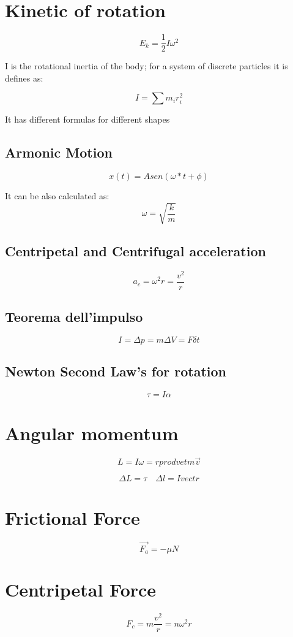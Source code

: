 \documentclass[Master.tex]{subfiles}
\begin{document}
\begin{multicols}{2}
		 \section{Kinetic of rotation}
		  \[
				   E_{k} = \frac{1}{2}I\omega ^2
		  \]

		  I is the rotational inertia of the body; for a system of discrete particles it
		  is defines as:

		  \[
				   I = \sum m_{i}r_{i}^2
		  \]

		  It has different formulas for different shapes

		  \subsection{Armonic Motion}
				   \[
						    x(t) = A sen (\omega * t + \phi )
				   \]

				   It can be also calculated as:
				   \[
						    \omega = \sqrt{\frac{k}{m}}
				   \]

		  \subsection{Centripetal and Centrifugal acceleration}
				   \[
						    a_{c} = \omega^2 r = \frac{v^2}{r}
				   \]

		  \subsection{Teorema dell'impulso}
				   \[
						    I = \Delta p = m \Delta V = F \delta t
				   \]
		  \subsection{Newton Second Law's for rotation}
				   \[
						    \tau = I \alpha
				   \]
		 \section{Angular momentum}
		  \[
				   L = I \omega = r prodvet m \vec{v}
		  \]

		  \[
				   \Delta L = \tau  \quad \Delta l = I vect r
		  \]

		 \section{Frictional Force}
		  \[
				   \vec{F_{a}} = -\mu N
		  \]

		 \section{Centripetal Force}
		  \[
				   F_{c} = m \frac{v^2}{r} = n \omega ^2 r
		  \]


\end{multicols}
\end{document}
